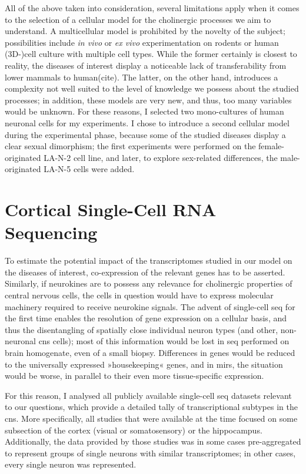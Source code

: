 All of the above taken into consideration, several limitations apply when it comes to the selection of a cellular model for the cholinergic processes we aim to understand. A multicellular model is prohibited by the novelty of the subject; possibilities include \textit{in vivo} or \textit{ex vivo} experimentation on rodents or human (3D-)cell culture with multiple cell types. While the former certainly is closest to reality, the diseases of interest display a noticeable lack of transferability from lower mammals to human(cite). The latter, on the other hand, introduces a complexity not well suited to the level of knowledge we possess about the studied processes; in addition, these models are very new, and thus, too many variables would be unknown. For these reasons, I selected two mono-cultures of human neuronal cells for my experiments. I chose to introduce a second cellular model during the experimental phase, because some of the studied diseases display a clear sexual dimorphism; the first experiments were performed on the female-originated LA-N-2 cell line, and later, to explore sex-related differences, the male-originated LA-N-5 cells were added.

\section{Cortical Single-Cell RNA Sequencing}
To estimate the potential impact of the transcriptomes studied in our model on the diseases of interest, co-expression of the relevant genes has to be asserted. Similarly, if neurokines are to possess any relevance for cholinergic properties of central nervous cells, the cells in question would have to express molecular machinery required to receive neurokine signals. The advent of single-cell \ac{seq} for the first time enables the resolution of gene expression on a cellular basis, and thus the disentangling of spatially close individual neuron types (and other, non-neuronal \ac{cns} cells); most of this information would be lost in \ac{seq} performed on brain homogenate, even of a small biopsy. Differences in genes would be reduced to the universally expressed »housekeeping« genes, and in \acp{mir}, the situation would be worse, in parallel to their even more tissue-specific expression.

For this reason, I analysed all publicly available single-cell \ac{seq} datasets relevant to our questions, which provide a detailed tally of transcriptional subtypes in the \ac{cns}. More specifically, all studies that were available at the time focused on some subsection of the cortex (visual or somatosensory) or the hippocampus. Additionally, the data provided by those studies was in some cases pre-aggregated to represent groups of single neurons with similar transcriptomes\cite{Zeisel2015, Tasic2016}; in other cases, every single neuron was represented\cite{Darmanis2015, Habib2016}. 

